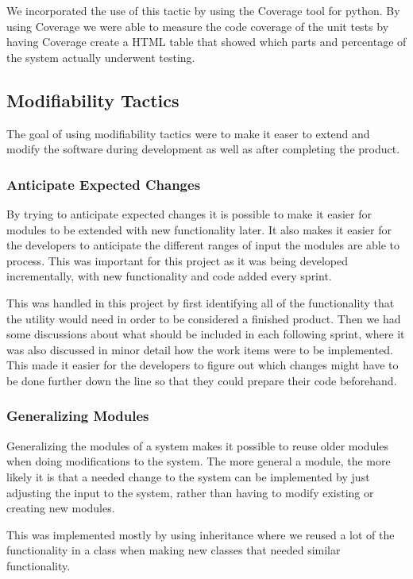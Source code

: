 We incorporated the use of this tactic by using the Coverage tool for python. By using Coverage we were able to measure the code coverage of the unit tests by having Coverage create a HTML table that showed which parts and percentage of the system actually underwent testing.

\subsection{Modifiability Tactics}
The goal of using modifiability tactics were to make it easer to extend and modify the software during development as well as after completing the product.

\subsubsection{Anticipate Expected Changes}
By trying to anticipate expected changes it is possible to make it easier for modules to be extended with new functionality later. It also makes it easier for the developers to anticipate the different ranges of input the modules are able to process. This was important for this project as it was being developed incrementally, with new functionality and code added every sprint.

This was handled in this project by first identifying all of the functionality that the utility would need in order to be considered a finished product. Then we had some discussions about what should be included in each following sprint, where it was also discussed in minor detail how the work items were to be implemented. This made it easier for the developers to figure out which changes might have to be done further down the line so that they could prepare their code beforehand.

\subsubsection{Generalizing Modules}
Generalizing the modules of a system makes it possible to reuse older modules when doing modifications to the system. The more general a module, the more likely it is that a needed change to the system can be implemented by just adjusting the input to the system, rather than having to modify existing or creating new modules.

This was implemented mostly by using inheritance where we reused a lot of the functionality in a class when making new classes that needed similar functionality.


